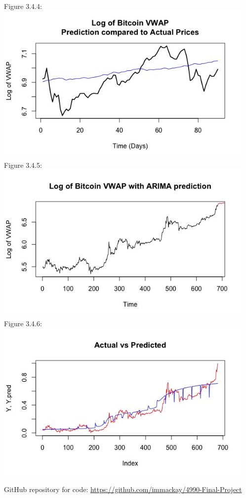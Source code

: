 \documentclass[12pt]{article}
\begin{document}
\begin{center}
  Figure 3.4.4:\\
  \includegraphics[width=5in]{plots/ts_plot7.jpeg}\\

  Figure 3.4.5:\\
  \includegraphics[width=5in]{plots/ts_plot8.jpeg}\\

  Figure 3.4.6:\\
  \includegraphics[width=5in]{plots/ts_plot9.jpeg}\\
  \end{center}

\pagebreak


GitHub repository for code: \url{https://github.com/immackay/4990-Final-Project}
\pagebreak


\end{document}
